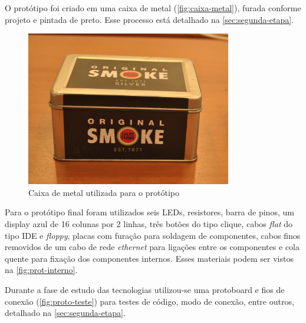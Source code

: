 \documentclass[
		12pt,				%
		openright,			%
		oneside,			%
		a4paper,			%
		chapter=TITLE,		%
		english,			%
		brazil				%
	]{abntex2}
\begin{document}
O protótipo foi criado em uma caixa de metal (\autoref{fig:caixa-metal}), furada conforme projeto e pintada de preto. Esse processo está detalhado na \autoref{sec:segunda-etapa}. 

\begin{figure}[htb]
	\caption{\label{fig:caixa-metal}Caixa de metal utilizada para o protótipo}
	\begin{center}
		\includegraphics[width=0.8\textwidth]{img/caixa-metal.jpg}
	\end{center}
\end{figure}

Para o protótipo final foram utilizados seis LEDs, resistores, barra de pinos, um display azul de 16 colunas por 2 linhas, três botões do tipo clique, cabos \textit{flat} do tipo IDE e \textit{floppy}, placas com furação para soldagem de componentes, cabos finos removidos de um cabo de rede \textit{ethernet} para ligações entre os componentes e cola quente para fixação dos componentes internos. Esses materiais podem ser vistos na \autoref{fig:prot-interno}.

Durante a fase de estudo das tecnologias utilizou-se uma protoboard e fios de conexão (\autoref{fig:proto-teste}) para testes de código, modo de conexão, entre outros, detalhado na \autoref{sec:segunda-etapa}.
\end{document}
